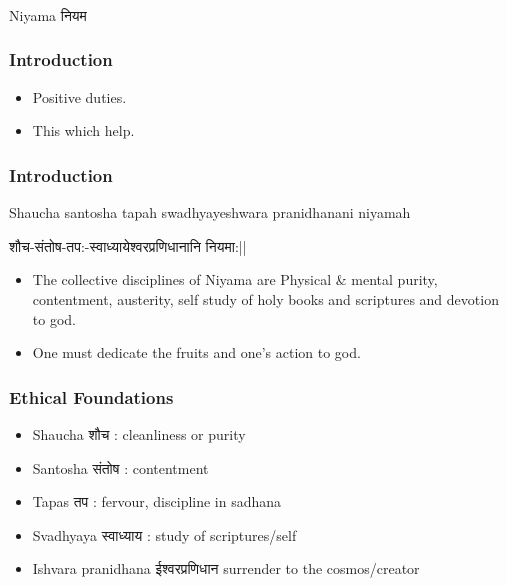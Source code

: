 \begin{frame}[fragile]\frametitle{}
\begin{center}
{\Large Niyama नियम}
\end{center}
\end{frame}

\begin{frame}[fragile]\frametitle{Introduction}


	\begin{itemize}
	\item Positive duties.
	\item This which help.
	\end{itemize}

\end{frame}

\begin{frame}[fragile]\frametitle{Introduction}

Shaucha santosha tapah swadhyayeshwara pranidhanani niyamah

शौच-संतोष-तप:-स्वाध्यायेश्वरप्रणिधानानि नियमा:||

	\begin{itemize}
	\item The  collective  disciplines  of 
Niyama  are  Physical  \&  mental 
purity, contentment, austerity,
self  study  of  holy  books  and 
scriptures and devotion to god. 
\item One  must  dedicate  the  fruits 
and one’s action to god.
	\end{itemize}

\end{frame}

\begin{frame}[fragile]\frametitle{Ethical Foundations}

	\begin{itemize}
	\item Shaucha शौच : cleanliness or purity
	\item Santosha संतोष : contentment
	\item Tapas तप : fervour, discipline in sadhana
	\item Svadhyaya स्वाध्याय : study of scriptures/self
	\item Ishvara pranidhana ईश्वरप्रणिधान surrender to the cosmos/creator
	\end{itemize}

\end{frame}


